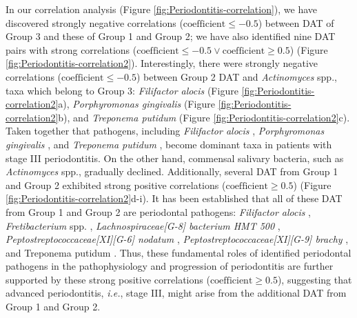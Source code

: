 \documentclass[11pt, a4paper, onecolumn, oneside]{report}
\begin{document}
            In our correlation analysis (Figure \ref{fig:Periodontitis-correlation}), we have discovered strongly negative correlations ($\textrm{coefficient} \le -0.5$) between DAT of Group 3 and these of Group 1 and Group 2; we have also identified nine DAT pairs with strong correlations ($\textrm{coefficient} \le -0.5 \vee \textrm{coefficient} \ge 0.5$) (Figure \ref{fig:Periodontitis-correlation2}). Interestingly, there were strongly negative correlations ($\textrm{coefficient} \le -0.5$) between Group 2 DAT and \textit{Actinomyces} spp., taxa which belong to Group 3: \textit{Filifactor alocis} (Figure \ref{fig:Periodontitis-correlation2}a), \textit{Porphyromonas gingivalis} (Figure \ref{fig:Periodontitis-correlation2}b), and \textit{Treponema putidum} (Figure \ref{fig:Periodontitis-correlation2}c). Taken together that pathogens, including \textit{Filifactor alocis} \cite{Periodontitis-31, Periodontitis-32}, \textit{Porphyromonas gingivalis} \cite{Periodontitis-22}, and \textit{Treponema putidum} \cite{Periodontitis-25}, become dominant taxa in patients with stage III periodontitis. On the other hand, commensal salivary bacteria, such as \textit{Actinomyces} spp., gradually declined. Additionally, several DAT from Group 1 and Group 2 exhibited strong positive correlations ($\textrm{coefficient} \ge 0.5$) (Figure \ref{fig:Periodontitis-correlation2}d-i). It has been established that all of these DAT from Group 1 and Group 2 are periodontal pathogens: \textit{Filifactor alocis} \cite{Periodontitis-31, Periodontitis-32}, \textit{Fretibacterium} spp. \cite{Periodontitis-33}, \textit{Lachnospiraceae[G-8] bacterium HMT 500} \cite{Periodontitis-8}, \textit{Peptostreptococcaceae[XI][G-6] nodatum} \cite{Periodontitis-8, Periodontitis-34}, \textit{Peptostreptococcaceae[XI][G-9] brachy} \cite{Periodontitis-8}, and Treponema putidum \cite{Periodontitis-25}. Thus, these fundamental roles of identified periodontal pathogens in the pathophysiology and progression of periodontitis are further supported by these strong positive correlations ($\textrm{coefficient} \ge 0.5$), suggesting that advanced periodontitis, \textit{i.e.}, stage III, might arise from the additional DAT from Group 1 and Group 2.
\end{document}
